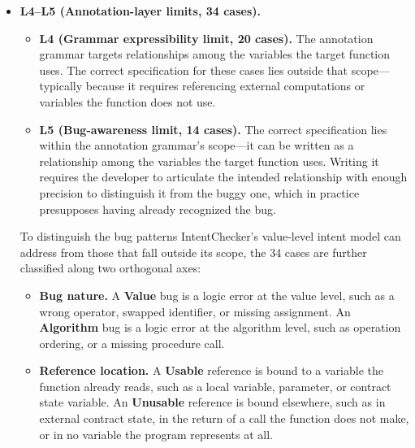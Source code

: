 \documentclass[pdflatex,sn-basic]{sn-jnl}%
\theoremstyle{thmstyleone}%
\theoremstyle{thmstyletwo}%
\theoremstyle{thmstylethree}%
\begin{document}
\begin{itemize}
  \item \textbf{L4--L5 (Annotation-layer limits, 34 cases).}
  \begin{itemize}
    \item \textbf{L4 (Grammar expressibility limit, 20 cases).} The annotation grammar targets relationships among the variables the target function uses. The correct specification for these cases lies outside that scope---typically because it requires referencing external computations or variables the function does not use.
    \item \textbf{L5 (Bug-awareness limit, 14 cases).} The correct specification lies within the annotation grammar's scope---it can be written as a relationship among the variables the target function uses. Writing it requires the developer to articulate the intended relationship with enough precision to distinguish it from the buggy one, which in practice presupposes having already recognized the bug.
  \end{itemize}

  \noindent To distinguish the bug patterns IntentChecker's value-level intent model can address from those that fall outside its scope, the 34 cases are further classified along two orthogonal axes:
  \begin{itemize}
    \item \textbf{Bug nature.} A \textbf{Value} bug is a logic error at the value level, such as a wrong operator, swapped identifier, or missing assignment. An \textbf{Algorithm} bug is a logic error at the algorithm level, such as operation ordering, or a missing procedure call.
    \item \textbf{Reference location.} A \textbf{Usable} reference is bound to a variable the function already reads, such as a local variable, parameter, or contract state variable. An \textbf{Unusable} reference is bound elsewhere, such as in external contract state, in the return of a call the function does not make, or in no variable the program represents at all.
  \end{itemize}


\end{itemize}
\end{document}

